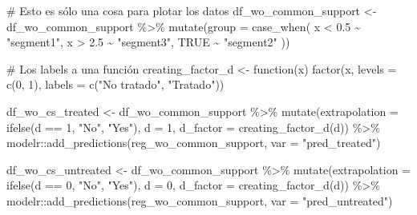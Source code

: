 \documentclass[
  letterpaper,
  DIV=11,
  numbers=noendperiod,
  oneside]{scrreprt}
\newenvironment{Shaded}{\begin{snugshade}}{\end{snugshade}}
\newcommand{\AttributeTok}[1]{\textcolor[rgb]{0.40,0.45,0.13}{#1}}
\newcommand{\CommentTok}[1]{\textcolor[rgb]{0.37,0.37,0.37}{#1}}
\newcommand{\ConstantTok}[1]{\textcolor[rgb]{0.56,0.35,0.01}{#1}}
\newcommand{\ControlFlowTok}[1]{\textcolor[rgb]{0.00,0.23,0.31}{#1}}
\newcommand{\DecValTok}[1]{\textcolor[rgb]{0.68,0.00,0.00}{#1}}
\newcommand{\FloatTok}[1]{\textcolor[rgb]{0.68,0.00,0.00}{#1}}
\newcommand{\FunctionTok}[1]{\textcolor[rgb]{0.28,0.35,0.67}{#1}}
\newcommand{\NormalTok}[1]{\textcolor[rgb]{0.00,0.23,0.31}{#1}}
\newcommand{\OtherTok}[1]{\textcolor[rgb]{0.00,0.23,0.31}{#1}}
\newcommand{\SpecialCharTok}[1]{\textcolor[rgb]{0.37,0.37,0.37}{#1}}
\newcommand{\StringTok}[1]{\textcolor[rgb]{0.13,0.47,0.30}{#1}}
\begin{document}
\begin{Shaded}
\begin{Highlighting}[]
\CommentTok{\# Esto es sólo una cosa para plotar los datos}
\NormalTok{df\_wo\_common\_support }\OtherTok{\textless{}{-}}\NormalTok{ df\_wo\_common\_support }\SpecialCharTok{\%\textgreater{}\%}
  \FunctionTok{mutate}\NormalTok{(}\AttributeTok{group =} \FunctionTok{case\_when}\NormalTok{(}
\NormalTok{    x }\SpecialCharTok{\textless{}} \FloatTok{0.5} \SpecialCharTok{\textasciitilde{}} \StringTok{"segment1"}\NormalTok{,}
\NormalTok{    x }\SpecialCharTok{\textgreater{}} \FloatTok{2.5} \SpecialCharTok{\textasciitilde{}} \StringTok{"segment3"}\NormalTok{,}
    \ConstantTok{TRUE} \SpecialCharTok{\textasciitilde{}} \StringTok{"segment2"}
\NormalTok{  ))}

\CommentTok{\# Los labels a una función}
\NormalTok{creating\_factor\_d }\OtherTok{\textless{}{-}} \ControlFlowTok{function}\NormalTok{(x) }\FunctionTok{factor}\NormalTok{(x,}
                                        \AttributeTok{levels =} \FunctionTok{c}\NormalTok{(}\DecValTok{0}\NormalTok{, }\DecValTok{1}\NormalTok{),}
                                        \AttributeTok{labels =} \FunctionTok{c}\NormalTok{(}\StringTok{"No tratado"}\NormalTok{,}
                                                   \StringTok{"Tratado"}\NormalTok{))}

\NormalTok{df\_wo\_cs\_treated }\OtherTok{\textless{}{-}}\NormalTok{ df\_wo\_common\_support }\SpecialCharTok{\%\textgreater{}\%} 
  \FunctionTok{mutate}\NormalTok{(}\AttributeTok{extrapolation =} \FunctionTok{ifelse}\NormalTok{(d }\SpecialCharTok{==} \DecValTok{1}\NormalTok{, }\StringTok{"No"}\NormalTok{, }\StringTok{"Yes"}\NormalTok{),}
         \AttributeTok{d =} \DecValTok{1}\NormalTok{,}
         \AttributeTok{d\_factor =} \FunctionTok{creating\_factor\_d}\NormalTok{(d)) }\SpecialCharTok{\%\textgreater{}\%} 
\NormalTok{  modelr}\SpecialCharTok{::}\FunctionTok{add\_predictions}\NormalTok{(reg\_wo\_common\_support, }\AttributeTok{var =} \StringTok{"pred\_treated"}\NormalTok{)}

\NormalTok{df\_wo\_cs\_untreated }\OtherTok{\textless{}{-}}\NormalTok{ df\_wo\_common\_support }\SpecialCharTok{\%\textgreater{}\%} 
  \FunctionTok{mutate}\NormalTok{(}\AttributeTok{extrapolation =} \FunctionTok{ifelse}\NormalTok{(d }\SpecialCharTok{==} \DecValTok{0}\NormalTok{, }\StringTok{"No"}\NormalTok{, }\StringTok{"Yes"}\NormalTok{),}
         \AttributeTok{d =} \DecValTok{0}\NormalTok{,}
         \AttributeTok{d\_factor =} \FunctionTok{creating\_factor\_d}\NormalTok{(d)) }\SpecialCharTok{\%\textgreater{}\%} 
\NormalTok{  modelr}\SpecialCharTok{::}\FunctionTok{add\_predictions}\NormalTok{(reg\_wo\_common\_support, }\AttributeTok{var =} \StringTok{"pred\_untreated"}\NormalTok{)}


\end{Highlighting}
\end{Shaded}
\end{document}
